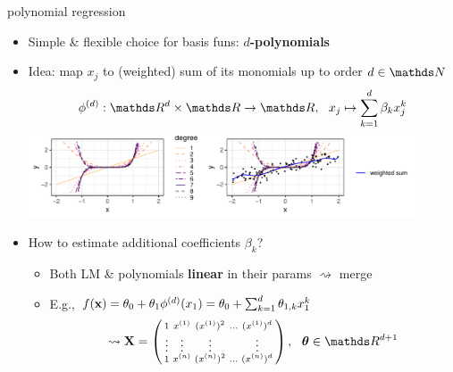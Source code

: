 \documentclass[11pt,compress,t,notes=noshow, xcolor=table]{beamer}
\begin{document}
\begin{frame}{polynomial regression}

\begin{itemize}
    \item Simple \& flexible choice for basis funs: \textbf{$d$-polynomials}
    \item Idea: map $x_j$ to (weighted) sum of its monomials up to order
    $d \in \N$
    $$ \phi^{(d)}: \R^d \times \R \rightarrow \R, ~~
    x_j \mapsto \sum_{k = 1}^d \beta_k x_j^k$$
    \includegraphics[width=0.9\textwidth]{figure/reg_poly_basis}
    \item How to estimate additional coefficients $\beta_k$?
    \begin{itemize}
      \item Both LM \& polynomials \textbf{linear} in their params
      $\rightsquigarrow$ merge
      \item E.g.,
      $f(\mathbf{x}) = \theta_0 + \theta_1 \phi^{(d)}(x_1)  =
      \theta_0 + \sum_{k = 1}^d \theta_{1, k} x_1^k$
      $$\rightsquigarrow \Xmat = \left(
      \begin{smallmatrix}
          1 & x^{(1)} & (x^{(1)})^2 & \hdots & (x^{(1)})^d \\
          \vdots & \vdots & \vdots & & \vdots \\
          1 & x^{(n)} & (x^{(n)})^2 & \hdots & (x^{(n)})^d \\
      \end{smallmatrix}
      \right),
      ~~ \thetab \in \R^{d + 1}
      $$
    \end{itemize}
\end{itemize}

\end{frame}

\end{document}
